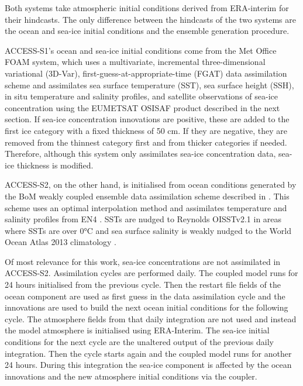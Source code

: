 \documentclass[tc, manuscript]{copernicus}
\begin{document}
Both systems take atmospheric initial conditions derived from
ERA-interim \citep{dee2011} for their hindcasts. The only difference
between the hindcasts of the two systems are the ocean and sea-ice
initial conditions and the ensemble generation procedure.

ACCESS-S1's ocean and sea-ice initial conditions come from the Met
Office FOAM system, which uses a multivariate, incremental
three-dimensional variational (3D-Var), first-guess-at-appropriate-time
(FGAT) data assimilation scheme \citep{waters2015} and assimilates sea
surface temperature (SST), sea surface height (SSH), in situ temperature
and salinity profiles, and satellite observations of sea-ice
concentration using the EUMETSAT OSISAF product described in the next
section. If sea-ice concentration innovations are positive, these are
added to the first ice category with a fixed thickness of 50 cm. If they
are negative, they are removed from the thinnest category first and from
thicker categories if needed. Therefore, although this system only
assimilates sea-ice concentration data, sea-ice thickness is modified.

ACCESS-S2, on the other hand, is initialised from ocean conditions
generated by the BoM weakly coupled ensemble data assimilation scheme
described in \citet{wedd2022}. This scheme uses an optimal interpolation
method and assimilates temperature and salinity profiles from EN4
\citep{good2013}. SSTs are nudged to Reynolds OISSTv2.1
\citep{reynolds2007} in areas where SSTs are over 0°C and sea surface
salinity is weakly nudged to the World Ocean Atlas 2013 climatology
\citep{zweng2013}.

Of most relevance for this work, sea-ice concentrations are not
assimilated in ACCESS-S2. Assimilation cycles are performed daily. The
coupled model runs for 24 hours initialised from the previous cycle.
Then the restart file fields of the ocean component are used as first
guess in the data assimilation cycle and the innovations are used to
build the next ocean initial conditions for the following cycle. The
atmosphere fields from that daily integration are not used and instead
the model atmosphere is initialised using ERA-Interim. The sea-ice
initial conditions for the next cycle are the unaltered output of the
previous daily integration. Then the cycle starts again and the coupled
model runs for another 24 hours. During this integration the sea-ice
component is affected by the ocean innovations and the new atmosphere
initial conditions via the coupler.
\end{document}
